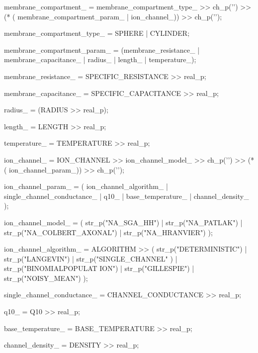 \begin{DoxyCode}
{      membrane_compartment_ = membrane_compartment_type_ >> ch_p('{') >> (* (
      membrane_compartment_param_ | ion_channel_)) >> ch_p('}');

      membrane_compartment_type_ = SPHERE | CYLINDER;

      membrane_compartment_param_ = (membrane_resistance_ | 
      membrane_capacitance_ | radius_ | length_ | temperature_);

      membrane_resistance_ = SPECIFIC_RESISTANCE >> real_p;

      membrane_capacitance_ = SPECIFIC_CAPACITANCE >> real_p;

      radius_ =  (RADIUS >> real_p);

      length_ =  LENGTH >> real_p;

      temperature_ = TEMPERATURE >> real_p;

      ion_channel_ = ION_CHANNEL >> ion_channel_model_ >> ch_p('{')  >> (*(
      ion_channel_param_)) >> ch_p('}');

      ion_channel_param_ = ( ion_channel_algorithm_ |
                             single_channel_conductance_ |
                               q10_ |
                             base_temperature_ |
                                               channel_density_
      );

            ion_channel_model_ =  ( str_p("NA_SGA_HH") |
                  str_p("NA_PATLAK") |
                  str_p("NA_COLBERT_AXONAL") |
                  str_p("NA_HRANVIER")
                );


      ion_channel_algorithm_ = ALGORITHM >> (     str_p("DETERMINISTIC") |
                                                           str_p("LANGEVIN") |
                                                           str_p("SINGLE_CHANNEL"
      ) |
                                                           str_p("BINOMIALPOPULAT
      ION") |
                                                           str_p("GILLESPIE")    
        |
                                                           str_p("NOISY_MEAN")
                                                         );

      single_channel_conductance_ = CHANNEL_CONDUCTANCE >> real_p;

      q10_ = Q10 >> real_p;

      base_temperature_ = BASE_TEMPERATURE >> real_p;

      channel_density_ = DENSITY >> real_p;
    }
\end{DoxyCode}




